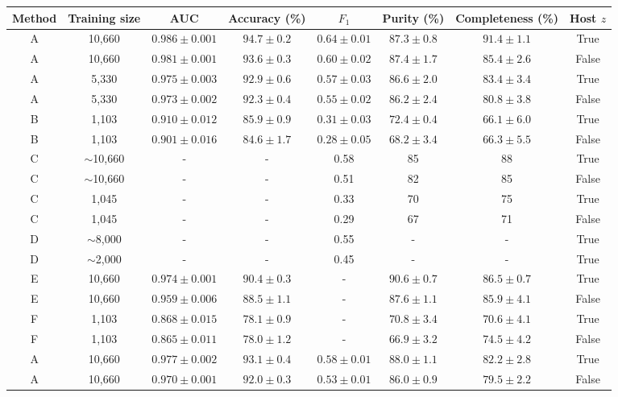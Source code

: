 \documentclass[twocolumn]{aastex61}
\begin{document}
\begin{table}[t!]
\centering
\begin{tabular}{ c  c  c  c  c  c  c  c }\hline\hline
Method & Training size & AUC & Accuracy (\%) & $F_1$ & Purity (\%) & Completeness (\%) & Host $z$ \\\hline\hline
A & 10,660 & $0.986 \pm 0.001$ & $94.7 \pm 0.2$ & $0.64 \pm 0.01$ & $87.3 \pm 0.8$ & $91.4 \pm 1.1$ & True \\
A & 10,660 & $0.981 \pm 0.001$ & $93.6 \pm 0.3$ & $0.60 \pm 0.02$ & $87.4 \pm 1.7$ & $85.4 \pm 2.6$ & False \\
A & 5,330 & $0.975 \pm 0.003$ & $92.9 \pm 0.6$ & $0.57 \pm 0.03$ & $86.6\pm 2.0$ & $83.4 \pm 3.4$ & True \\
A & 5,330 & $0.973 \pm 0.002$ & $92.3 \pm 0.4$ & $0.55 \pm 0.02$ & $86.2 \pm 2.4$ & $80.8 \pm 3.8$ & False \\
B & 1,103 & $0.910 \pm 0.012$ & $85.9 \pm 0.9$ & $0.31 \pm 0.03$ & $72.4 \pm 0.4$ & $66.1 \pm 6.0$ & True \\
B & 1,103 & $0.901 \pm 0.016$ & $84.6 \pm 1.7$ & $0.28 \pm 0.05$ & $68.2 \pm 3.4$ & $66.3 \pm 5.5$ & False \\
C & $\sim$10,660 & - & - & 0.58 & 85 & 88 & True \\
C & $\sim$10,660 & - & - & 0.51 & 82 & 85 & False \\
C & 1,045 & - & - & 0.33 & 70 & 75 & True \\
C & 1,045 & - & - & 0.29 & 67 & 71 & False \\
D & $\sim$8,000 & - & - & 0.55 & - & - & True \\
D & $\sim$2,00$\underset{~}{0}$ & - & - & 0.45 & - & - & True \\
\hline\hline
E & 10,660 & $0.974 \pm 0.001$ & $90.4 \pm 0.3$ & - & $90.6 \pm 0.7$ & $86.5 \pm 0.7$ & True\\
E & 10,660 & $0.959 \pm 0.006$ & $88.5 \pm 1.1$ & - & $87.6 \pm 1.1$ & $85.9 \pm 4.1$ & False\\
F & 1,103 & $0.868 \pm 0.015$ & $78.1 \pm 0.9$ & - & $70.8 \pm 3.4$ & $70.6 \pm 4.1$ & True\\
F & 1,103 & $0.865 \pm 0.011$ & $78.0 \pm 1.2$ & - & $66.9 \pm 3.2$ & $74.5 \pm 4.2$ & False\\\hline\hline
A & 10,660 & $0.977 \pm 0.002$ & $93.1 \pm 0.4$ & $0.58 \pm 0.01$ & $88.0 \pm 1.1$ & $82.2 \pm 2.8$ & True\\
A & 10,660 & $0.970 \pm 0.001$ & $92.0 \pm 0.3$ & $0.53 \pm 0.01$ & $86.0 \pm 0.9$ & $79.5 \pm 2.2$ & False\\

\end{tabular}
\end{table}
\end{document}

